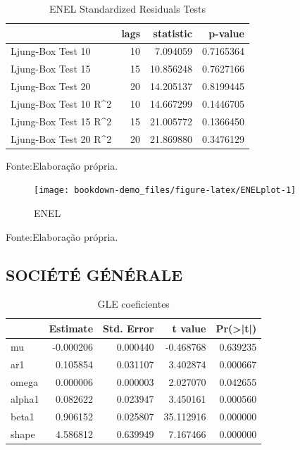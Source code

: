 \documentclass[
  12pt,
  a4paper,
  openany]{book}
\begin{document}
\begin{table}[!h]

\caption{\label{tab:unnamed-chunk-24}ENEL Standardized Residuals Tests}
\centering
\begin{tabular}[t]{lrrr}
\toprule
  & lags & statistic & p-value\\
\midrule
Ljung-Box Test 10 & 10 & 7.094059 & 0.7165364\\
Ljung-Box Test 15 & 15 & 10.856248 & 0.7627166\\
Ljung-Box Test 20 & 20 & 14.205137 & 0.8199445\\
Ljung-Box Test 10 R\textasciicircum{}2 & 10 & 14.667299 & 0.1446705\\
Ljung-Box Test 15 R\textasciicircum{}2 & 15 & 21.005772 & 0.1366450\\
\addlinespace
Ljung-Box Test 20 R\textasciicircum{}2 & 20 & 21.869880 & 0.3476129\\
\bottomrule
\end{tabular}
\end{table}
\FloatBarrier
\centering

Fonte:Elaboração própria.

\justifying
\bigskip
\begin{figure}

{\centering \texttt{[image: bookdown-demo\_files/figure-latex/ENELplot-1]} 

}

\caption{ENEL}\label{fig:ENELplot}
\end{figure}
\FloatBarrier
\centering

Fonte:Elaboração própria.

\justifying
\bigskip

\hypertarget{sociuxe9tuxe9-guxe9nuxe9rale}{%
\subsection{SOCIÉTÉ GÉNÉRALE}\label{sociuxe9tuxe9-guxe9nuxe9rale}}

\begin{table}[!h]

\caption{\label{tab:unnamed-chunk-26}GLE coeficientes}
\centering
\begin{tabular}[t]{lrrrr}
\toprule
  &  Estimate &  Std. Error &  t value & Pr(>|t|)\\
\midrule
mu & -0.000206 & 0.000440 & -0.468768 & 0.639235\\
ar1 & 0.105854 & 0.031107 & 3.402874 & 0.000667\\
omega & 0.000006 & 0.000003 & 2.027070 & 0.042655\\
alpha1 & 0.082622 & 0.023947 & 3.450161 & 0.000560\\
beta1 & 0.906152 & 0.025807 & 35.112916 & 0.000000\\
\addlinespace
shape & 4.586812 & 0.639949 & 7.167466 & 0.000000\\
\bottomrule
\end{tabular}
\end{table}
\FloatBarrier
\centering
\end{document}

